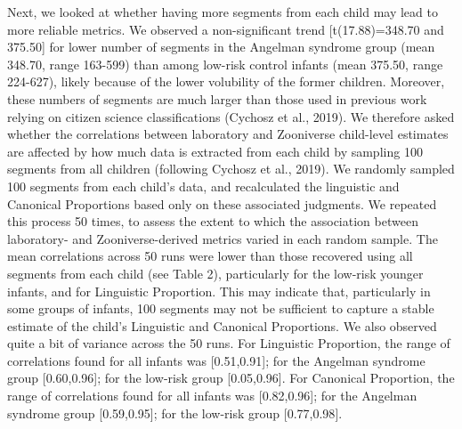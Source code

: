 \documentclass[english,,man,floatsintext]{apa6}
\begin{document}
Next, we looked at whether having more segments from each child may lead to more reliable metrics. We observed a non-significant trend {[}t(17.88)=348.70 and 375.50{]} for lower number of segments in the Angelman syndrome group (mean 348.70, range 163-599) than among low-risk control infants (mean 375.50, range 224-627), likely because of the lower volubility of the former children. Moreover, these numbers of segments are much larger than those used in previous work relying on citizen science classifications (Cychosz et al., 2019). We therefore asked whether the correlations between laboratory and Zooniverse child-level estimates are affected by how much data is extracted from each child by sampling 100 segments from all children (following Cychosz et al., 2019). We randomly sampled 100 segments from each child's data, and recalculated the linguistic and Canonical Proportions based only on these associated judgments. We repeated this process 50 times, to assess the extent to which the association between laboratory- and Zooniverse-derived metrics varied in each random sample. The mean correlations across 50 runs were lower than those recovered using all segments from each child (see Table 2), particularly for the low-risk younger infants, and for Linguistic Proportion. This may indicate that, particularly in some groups of infants, 100 segments may not be sufficient to capture a stable estimate of the child's Linguistic and Canonical Proportions. We also observed quite a bit of variance across the 50 runs. For Linguistic Proportion, the range of correlations found for all infants was {[}0.51,0.91{]}; for the Angelman syndrome group {[}0.60,0.96{]}; for the low-risk group {[}0.05,0.96{]}. For Canonical Proportion, the range of correlations found for all infants was {[}0.82,0.96{]}; for the Angelman syndrome group {[}0.59,0.95{]}; for the low-risk group {[}0.77,0.98{]}.
\end{document}
